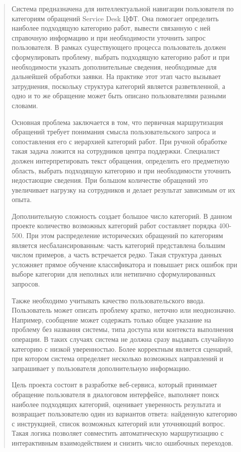 \documentclass[
]{article}
\begin{document}
\begin{quote}
Система предназначена для интеллектуальной навигации пользователя по
категориям обращений Service Desk ЦФТ. Она помогает определить наиболее
подходящую категорию работ, вывести связанную с ней справочную
информацию и при необходимости уточнить запрос пользователя. В рамках
существующего процесса пользователь должен сформулировать проблему,
выбрать подходящую категорию работ и при необходимости указать
дополнительные сведения, необходимые для дальнейшей обработки заявки. На
практике этот этап часто вызывает затруднения, поскольку структура
категорий является разветвленной, а одно и то же обращение может быть
описано пользователями разными словами.

Основная проблема заключается в том, что первичная маршрутизация
обращений требует понимания смысла пользовательского запроса и
сопоставления его с иерархией категорий работ. При ручной обработке
такая задача ложится на сотрудников центра поддержки. Специалист должен
интерпретировать текст обращения, определить его предметную область,
выбрать подходящую категорию и при необходимости уточнить недостающие
сведения. При большом количестве обращений это увеличивает нагрузку на
сотрудников и делает результат зависимым от их опыта.

Дополнительную сложность создает большое число категорий. В данном
проекте количество возможных категорий работ составляет порядка 400-500.
При этом распределение исторических обращений по категориям является
несбалансированным: часть категорий представлена большим числом
примеров, а часть встречается редко. Такая структура данных усложняет
прямое обучение классификатора и повышает риск ошибок при выборе
категории для неполных или нетипично сформулированных запросов.

Также необходимо учитывать качество пользовательского ввода.
Пользователь может описать проблему кратко, неточно или неоднозначно.
Например, сообщение может содержать только общее указание на проблему
без названия системы, типа доступа или контекста выполнения операции. В
таких случаях система не должна сразу выдавать случайную категорию с
низкой уверенностью. Более корректным является сценарий, при котором
система определяет несколько возможных направлений и запрашивает у
пользователя дополнительную информацию.

Цель проекта состоит в разработке веб-сервиса, который принимает
обращение пользователя в диалоговом интерфейсе, выполняет поиск наиболее
подходящих категорий, оценивает уверенность результата и возвращает
пользователю один из вариантов ответа: найденную категорию с
инструкцией, список возможных категорий или уточняющий вопрос. Такая
логика позволяет совместить автоматическую маршрутизацию с интерактивным
взаимодействием и снизить число ошибочных переходов.


\end{quote}
\end{document}
